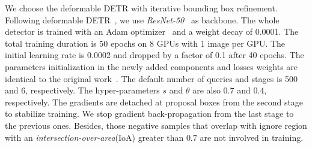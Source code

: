 \documentclass[final]{cvpr}
\begin{document}
We choose the deformable DETR with iterative bounding box refinement. Following deformable DETR~\cite{zhu2021deformable}, we use \emph{ResNet-50}~\cite{he2016deep} as backbone. The whole detector is trained with an Adam optimizer~\cite{kingma2014adam} and a weight decay of 0.0001. The total training duration is 50 epochs on 8 GPUs with 1 image per GPU. The initial learning rate is 0.0002 and dropped by a factor of 0.1 after 40 epochs. The parameters initialization in the newly added components and losses weights are identical to the original work~\cite{zhu2021deformable}. The default number of queries and stages is 500 and 6, respectively. The hyper-parameters $s$ and $\theta$ are also $0.7$ and $0.4$, respectively. The gradients are detached at proposal boxes from the second stage to stabilize training. We stop gradient back-propagation from the last stage to the previous ones. Besides, those negative samples that overlap with ignore region with an \textit{intersection-over-area}(IoA) greater than $0.7$ are not involved in training.
\end{document}
